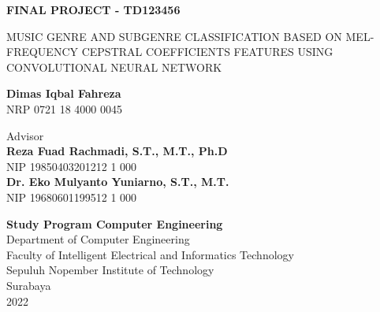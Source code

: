 \begin{flushleft}
  \fontsize{14pt}{17}
  \selectfont
  \textbf{FINAL PROJECT - TD123456}
\end{flushleft}


\vspace{5ex}

\begin{flushleft}
  \fontsize{18pt}{22}
  \selectfont
  MUSIC GENRE AND SUBGENRE CLASSIFICATION BASED ON MEL-FREQUENCY CEPSTRAL COEFFICIENTS FEATURES USING CONVOLUTIONAL NEURAL NETWORK
\end{flushleft}

\vspace{6ex}

\begin{flushleft}
	\fontsize{14pt}{17}
	\selectfont
	\textbf{Dimas Iqbal Fahreza}
	\\
	NRP 0721 18 4000 0045
\end{flushleft}

\vspace{6ex}

\begin{flushleft}
	\fontsize{14pt}{17}
	\selectfont
	Advisor\\
	\textbf{Reza Fuad Rachmadi, S.T., M.T., Ph.D} \\
	NIP 19850403201212 1 000 \\
	\textbf{Dr. Eko Mulyanto Yuniarno, S.T., M.T.} \\
	NIP 19680601199512 1 000 \\
\end{flushleft}

\vspace{6ex}

\begin{flushleft}
  \fontsize{12pt}{15}
  \selectfont
  \textbf{Study Program Computer Engineering}\\
  Department of Computer Engineering\\
  Faculty of Intelligent Electrical and Informatics Technology\\
  Sepuluh Nopember Institute of Technology\\
  Surabaya\\
  2022
\end{flushleft}
